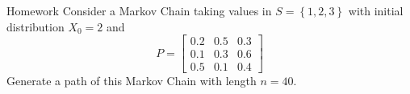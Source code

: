 \documentclass[8pt]{beamer}
\begin{document}
\begin{frame}{Homework}
Consider a Markov Chain taking values in $S=\left\{ 1,2, 3\right\}$ with initial distribution $X_0=2$ and
\begin{equation*}
P=\left[ \begin{array}{ccc} 0.2 & 0.5 & 0.3\\ 0.1 & 0.3 & 0.6\\
0.5 & 0.1 & 0.4 \end{array}\right]
\end{equation*}
Generate a path of this Markov Chain with length $n=40$.
\end{frame}
\end{document}
